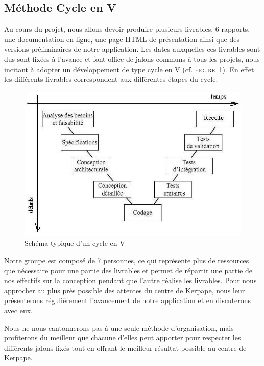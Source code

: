 \subsection{Méthode Cycle en V}
Au cours du projet, nous allons devoir produire plusieurs livrables, 6 rapports, une documentation en ligne, une page HTML de présentation ainsi que des versions préliminaires de notre application. Les dates auxquelles ces livrables sont dus sont fixées à l'avance et font office de jalons communs à tous les projets, nous incitant à adopter un développement de type cycle en V (cf. \textsc{figure~\ref{cycle_v}}). En effet les différents livrables correspondent aux différentes étapes du cycle. \newline
\begin{figure}[ht]
  \centering
  \includegraphics[width=\linewidth]{3-Planification/img-utilisateur/cycle_v}
  \caption{Schéma typique d'un cycle en V}
  \label{cycle_v}
\end{figure}

Notre groupe est composé de 7 personnes, ce qui représente plus de ressources que nécessaire pour une partie des livrables et permet de répartir une partie de nos effectifs sur la conception pendant que l'autre réalise les livrables. Pour nous approcher au plus près possible des attentes du centre de Kerpape,  nous leur présenterons régulièrement l'avancement de notre application et en discuterons avec eux.\newline

Nous ne nous cantonnerons pas à une seule méthode d'organisation, mais profiterons du meilleur que chacune d'elles peut apporter pour respecter les différents jalons fixés tout en offrant le meilleur résultat possible au centre de Kerpape. 

